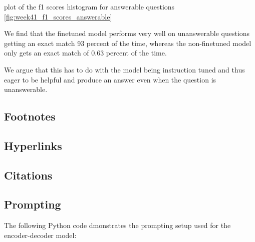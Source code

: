 \documentclass[11pt]{article}
\begin{document}

plot of the f1 scores histogram for answerable questions
\ref{fig:week41_f1_scores_answerable}


We find that the finetuned model performs very well on unanswerable questions getting an exact match 93 percent of the time, whereas the 
non-finetuned model only gets an exact match of 0.63 percent of the time. 

We argue that this has to do with the model being instruction tuned and 
thus eager to be helpful and produce an answer even when the question is unanswerable.



\subsection{Footnotes}

\subsection{Hyperlinks}
\subsection{Citations}


\appendix


\subsection{Prompting}
\label{sec:prompting}
The following Python code dmonstrates the prompting setup used for the encoder-decoder model:
\end{document}
